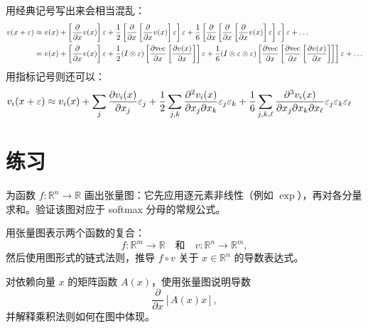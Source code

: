 用经典记号写出来会相当混乱：
\begin{align*}
    v(x + \varepsilon)
    &\approx
    v(x)
    + \left[\frac{\partial}{\partial x} v(x)\right]\varepsilon
    + \frac{1}{2}\left[\frac{\partial}{\partial x}\left[\frac{\partial}{\partial x} v(x)\right]\varepsilon\right]\varepsilon
    + \frac{1}{6}\left[\frac{\partial}{\partial x}\left[\frac{\partial}{\partial x} \left[\frac{\partial}{\partial x} v(x)\right]\varepsilon\right]\varepsilon\right]\varepsilon
    + \dots
    \\
    &=
    v(x)
    + \left[\frac{\partial}{\partial x} v(x)\right]\varepsilon
    +
    \frac{1}{2}
    (I \otimes \varepsilon)
    \left[\frac{\partial\mathrm{vec}}{\partial x}\left[\frac{\partial v(x)}{\partial x} \right]\right]\varepsilon
    + \frac{1}{6}
    (I \otimes \varepsilon \otimes \varepsilon)
    \left[\frac{\partial\mathrm{vec}}{\partial x}\left[\frac{\partial\mathrm{vec}}{\partial x} \left[\frac{\partial v(x)}{\partial x} \right]\right]\right]\varepsilon
    + \dots
\end{align*}
用指标记号则还可以：
\begin{align*}
    v_i(x + \varepsilon)
    &\approx
    v_i(x)
    + \sum_j \frac{\partial v_i(x)}{\partial x_j} \varepsilon_j
    + \frac12 \sum_{j,k} \frac{\partial^2 v_i(x)}{\partial x_j\partial x_k} \varepsilon_j \varepsilon_k
   + \frac16 \sum_{j,k,\ell} \frac{\partial^3 v_i(x)}{\partial x_j\partial x_k\partial x_\ell} \varepsilon_j \varepsilon_k \varepsilon_\ell
\end{align*}



\section{练习}
\begin{exercise}
   为函数 $f:\mathbb{R}^n\to\mathbb{R}$ 画出张量图：它先应用逐元素非线性（例如 $\exp$），再对各分量求和。验证该图对应于 softmax 分母的常规公式。
\end{exercise}

\begin{exercise}
   用张量图表示两个函数的复合：
   \[
      f:\mathbb{R}^m\to\mathbb{R} \quad \text{和} \quad v:\mathbb{R}^n\to\mathbb{R}^m,
   \]
   然后使用图形式的链式法则，推导 $f\circ v$ 关于 $x\in\mathbb{R}^n$ 的导数表达式。
\end{exercise}

\begin{exercise}
   对依赖向量 $x$ 的矩阵函数 $A(x)$，使用张量图说明导数
   \[
      \frac{\partial}{\partial x}[A(x)x],
   \]
   并解释乘积法则如何在图中体现。
\end{exercise}

